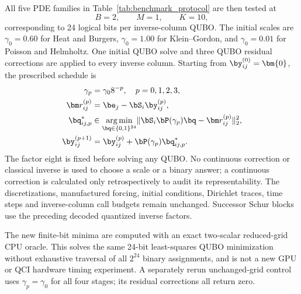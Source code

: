 All five PDE families in Table~\ref{tab:benchmark_protocol} are then tested at
\begin{equation}
    B=2,\qquad M=1,\qquad K=10,
    \label{eq:fixed_validation_encoding}
\end{equation}
corresponding to 24 logical bits per inverse-column QUBO. The initial scales
are $\gamma_0=0.60$ for Heat and Burgers, $\gamma_0=1.00$ for
Klein--Gordon, and $\gamma_0=0.01$ for Poisson and Helmholtz. One initial
QUBO solve and three QUBO residual corrections are applied to every inverse
column. Starting from $\by_{ij}^{(0)}=\bm{0}$, the prescribed schedule is
\begin{align}
  \gamma_p &= \gamma_0 8^{-p},\quad p=0,1,2,3,
    \label{eq:five_pde_scale_schedule}\\
  \bm r_{ij}^{(p)} &= \be_j-\bS_i\by_{ij}^{(p)},\notag\\
  \bq_{ij,p}^{*} &\in \underset{\bq\in\{0,1\}^{24}}{\operatorname{arg\,min}}
    \|\bS_i\bP(\gamma_p)\bq-\bm r_{ij}^{(p)}\|_2^2,\notag\\
  \by_{ij}^{(p+1)} &= \by_{ij}^{(p)}+\bP(\gamma_p)\bq_{ij,p}^{*}.
    \label{eq:five_pde_multiscale}
\end{align}
The factor eight is fixed before solving any QUBO. No continuous correction
or classical inverse is used to choose a scale or a binary answer; a
continuous correction is calculated only retrospectively to audit its
representability. The discretizations, manufactured forcing, initial
conditions, Dirichlet traces, time steps and inverse-column call budgets
remain unchanged. Successor Schur blocks use the preceding decoded quantized
inverse factors.

The new finite-bit minima are computed with an exact two-scalar reduced-grid
CPU oracle. This solves the same 24-bit least-squares QUBO minimization
without exhaustive traversal of all $2^{24}$ binary assignments, and is not
a new GPU or QCI hardware timing experiment. A separately rerun unchanged-grid
control uses $\gamma_p=\gamma_0$ for all four stages; its residual corrections
all return zero.
